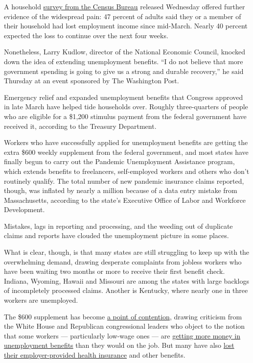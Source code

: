 A household
\href{https://www.census.gov/library/stories/2020/05/new-household-pulse-survey-shows-concern-over-food-security-loss-of-income.html}{survey
from the Census Bureau} released Wednesday offered further evidence of
the widespread pain: 47 percent of adults said they or a member of their
household had lost employment income since mid-March. Nearly 40 percent
expected the loss to continue over the next four weeks.

Nonetheless, Larry Kudlow, director of the National Economic Council,
knocked down the idea of extending unemployment benefits. ``I do not
believe that more government spending is going to give us a strong and
durable recovery,'' he said Thursday at an event sponsored by The
Washington Post.

Emergency relief and expanded unemployment benefits that Congress
approved in late March have helped tide households over. Roughly
three-quarters of people who are eligible for a \$1,200 stimulus payment
from the federal government have received it, according to the Treasury
Department.

Workers who have successfully applied for unemployment benefits are
getting the extra \$600 weekly supplement from the federal government,
and most states have finally begun to carry out the Pandemic
Unemployment Assistance program, which extends benefits to freelancers,
self-employed workers and others who don't routinely qualify. The total
number of new pandemic insurance claims reported, though, was inflated
by nearly a million because of a data entry mistake from Massachusetts,
according to the state's Executive Office of Labor and Workforce
Development.

Mistakes, lags in reporting and processing, and the weeding out of
duplicate claims and reports have clouded the unemployment picture in
some places.

What is clear, though, is that many states are still struggling to keep
up with the overwhelming demand, drawing desperate complaints from
jobless workers who have been waiting two months or more to receive
their first benefit check. Indiana, Wyoming, Hawaii and Missouri are
among the states with large backlogs of incompletely processed claims.
Another is Kentucky, where nearly one in three workers are unemployed.

The \$600 supplement has become
\href{https://www.washingtonpost.com/politics/trump-expresses-opposition-to-extending-unemployment-benefits-enacted-in-response-to-pandemic/2020/05/19/19ae0e50-9a12-11ea-a282-386f56d579e6_story.html}{a
point of contention}, drawing criticism from the White House and
Republican congressional leaders who object to the notion that some
workers --- particularly low-wage ones --- are
\href{https://bfi.uchicago.edu/working-paper/2020-62/}{getting more
money in unemployment benefits} than they would on the job. But many
have also
\href{https://www.epi.org/blog/16-2-million-workers-have-likely-lost-employer-provided-health-insurance-since-the-coronavirus-shock-began/}{lost
their employer-provided health insurance} and other benefits.

